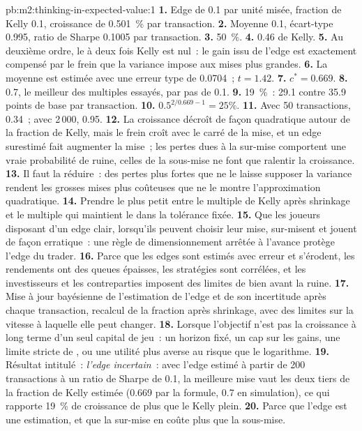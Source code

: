 \begin{solution}{pb:m2:thinking-in-expected-value:1}
\textbf{1.} Edge de 0.1 par unité misée, fraction de Kelly 0.1, croissance de 0.501~\% par transaction.
\textbf{2.} Moyenne 0.1, écart-type 0.995, ratio de Sharpe 0.1005 par transaction.
\textbf{3.} 50~\%.
\textbf{4.} 0.46 de Kelly.
\textbf{5.} Au deuxième ordre, le  à deux fois Kelly est nul~: le gain issu de l'edge
est exactement compensé par le frein que la variance impose aux mises plus grandes.
\textbf{6.} La moyenne est estimée avec une erreur type de 0.0704~; $t = 1.42$.
\textbf{7.} $c^* = 0.669$.
\textbf{8.} 0.7, le meilleur des multiples essayés, par pas de 0.1.
\textbf{9.} 19~\%~: 29.1 contre 35.9 points de base par transaction.
\textbf{10.} $0.5^{2/0.669 - 1} = 25\%$.
\textbf{11.} Avec 50 transactions, 0.34~; avec 2\,000, 0.95.
\textbf{12.} La croissance décroît de façon quadratique autour de la fraction de Kelly, mais le frein croît avec
le carré de la mise, et un edge surestimé fait augmenter la mise~; les pertes
dues à la sur-mise comportent une vraie probabilité de ruine, celles de la sous-mise ne font que ralentir la croissance.
\textbf{13.} Il faut la réduire~: des pertes plus fortes que ne le laisse supposer la variance rendent les grosses mises plus coûteuses
que ne le montre l'approximation quadratique.
\textbf{14.} Prendre le plus petit entre le multiple de Kelly après shrinkage et le multiple qui maintient le
 dans la tolérance fixée.
\textbf{15.} Que les joueurs disposant d'un edge clair, lorsqu'ils peuvent choisir leur mise, sur-misent et jouent de façon erratique~:
une règle de dimensionnement arrêtée à l'avance protège l'edge du trader.
\textbf{16.} Parce que les edges sont estimés avec erreur et s'érodent, les rendements ont des queues épaisses,
les stratégies sont corrélées, et les investisseurs et les contreparties imposent des limites de  bien
avant la ruine.
\textbf{17.} Mise à jour bayésienne de l'estimation de l'edge et de son incertitude après chaque
transaction, recalcul de la fraction après shrinkage, avec des limites sur la vitesse à laquelle elle peut changer.
\textbf{18.} Lorsque l'objectif n'est pas la croissance à long terme d'un seul capital de jeu~: un horizon fixé, un cap
sur les gains, une limite stricte de , ou une utilité plus averse au risque que le logarithme.
\textbf{19.} Résultat intitulé~: \emph{l'edge incertain}~: avec l'edge estimé à partir de 200 transactions
à un ratio de Sharpe de 0.1, la meilleure mise vaut les deux tiers de la fraction de Kelly estimée
(0.669 par la formule, 0.7 en simulation), ce qui rapporte 19~\% de croissance de plus que le Kelly plein.
\textbf{20.} Parce que l'edge est une estimation, et que la sur-mise en coûte plus que
la sous-mise.
\end{solution}

